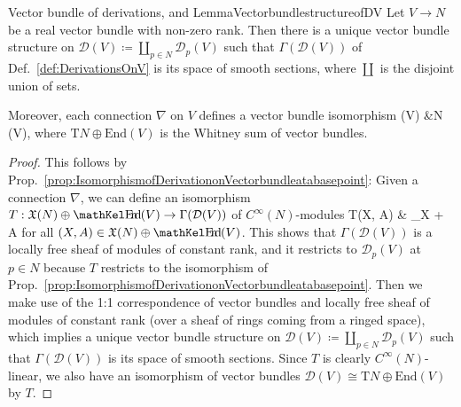 %

\begin{lemmata}{Vector bundle of derivations, \newline \cite[variation of the introduction in Example 3.3.4, page 102f.]{mackenzieGeneralTheory} and \cite[Example 3.10]{basicconn}}{LemmaVectorbundlestructureofDV}
Let $V \to N$ be a real vector bundle with non-zero rank. Then there is a unique vector bundle structure on $\mathcal{D}(V) \coloneqq \coprod_{p \in N} \mathcal{D}_p(V)$ such that $\Gamma(\mathcal{D}(V))$ of Def.~\ref{def:DerivationsOnV} is its space of smooth sections, where $\coprod$ is the disjoint union of sets.

Moreover, each connection $\nabla$ on $V$ defines a vector bundle isomorphism
\ba
{}(V) &\cong {}N \oplus {}(V), 
\ea
where $\mathrm{T}N \oplus \mathrm{End}(V)$ is the Whitney sum of vector bundles.
\end{lemmata}

\begin{proof}
\leavevmode\newline
This follows by Prop.~\ref{prop:IsomorphismofDerivationonVectorbundleatabasepoint}: Given a connection $\nabla$, we can define an isomorphism $T: \mathfrak{X}(N) \oplus \sEnd(V) \to \Gamma(\mathcal{D}(V))$ of $C^\infty(N)$-modules 
\ba
T(X, A)
&\coloneqq
\nabla_X + A
\ea
for all $(X, A) \in \mathfrak{X}(N) \oplus \sEnd(V)$. This shows that $\Gamma(\mathcal{D}(V))$ is a locally free sheaf of modules of constant rank, and it restricts to $\mathcal{D}_p(V)$ at $p \in N$ because $T$ restricts to the isomorphism of Prop.~\ref{prop:IsomorphismofDerivationonVectorbundleatabasepoint}. Then we make use of the 1:1 correspondence of vector bundles and locally free sheaf of modules of constant rank (over a sheaf of rings coming from a ringed space), which implies a unique vector bundle structure on $\mathcal{D}(V) \coloneqq \coprod_{p \in N} \mathcal{D}_p(V)$ such that $\Gamma(\mathcal{D}(V))$ is its space of smooth sections. Since $T$ is clearly $C^\infty(N)$-linear, we also have an isomorphism of vector bundles $\mathcal{D}(V) \cong \mathrm{T}N \oplus \mathrm{End}(V)$ by $T$.
\end{proof}

